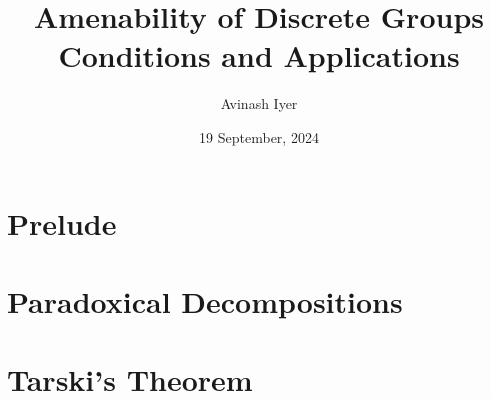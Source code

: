\documentclass[10pt]{package2}
\title{Amenability of Discrete Groups\\ {\large Conditions and Applications}}
\author{Avinash Iyer}
\date{19 September, 2024}
\begin{document}
\maketitle
\tableofcontents
\chapter{Prelude}
\chapter{Paradoxical Decompositions}
\chapter{Tarski's Theorem}
\end{document}
